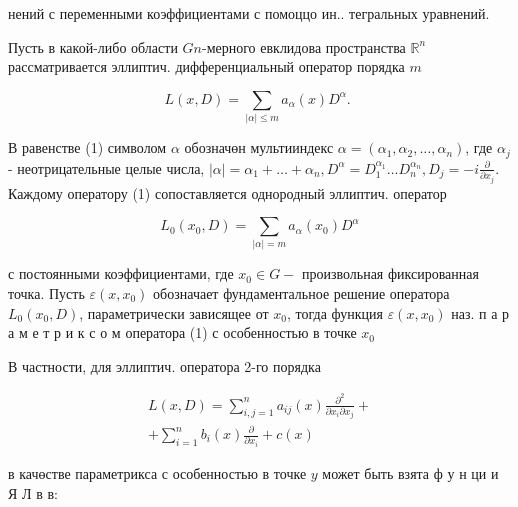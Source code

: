 \documentclass[10pt]{article}
\begin{document}
нений с переменными коэффициентами с помоццо ин.. тегральных уравнений.



Пусть в какой-либо области $G n$-мерного евклидова пространства $\mathbb{R}^{n}$ рассматривается эллиптич. дифференциальный оператор порядка $m$



\[

L(x, D)=\sum_{|\alpha| \leqslant m} a_{\alpha}(x) D^{\alpha} \text {. }

\]



В равенстве (1) символом $\alpha$ обозначөн мультииндекс $\alpha=\left(\alpha_{1}, \alpha_{2}, \ldots, \alpha_{n}\right)$, где $\alpha_{j}$ - неотрицательные целые числа, $|\alpha|=\alpha_{1}+\ldots+\alpha_{n}, D^{\alpha}=D_{1}^{\alpha_{1}} \ldots D_{n}^{\alpha_{n}}, D_{j}=-i \frac{\partial}{\partial x_{j}}$. Каждому оператору (1) сопоставляется однородный эллиптич. оператор



\[

L_{0}\left(x_{0}, D\right)=\sum_{|\alpha|=m} a_{\alpha}\left(x_{0}\right) D^{\alpha}

\]



с постоянными коэффициентами, где $x_{0} \in G-$ произвольная фиксированная точка. Пусть $\varepsilon\left(x, x_{0}\right)$ обозначает фундаментальное решение оператора $L_{0}\left(x_{0}, D\right)$, параметрически зависящее от $x_{0}$, тогда функция $\varepsilon\left(x, x_{0}\right)$ наз. п а р а м е т р и к с о м оператора (1) с особенностью в точке $x_{0}$



В частности, для эллиптич. оператора 2-го порядка



\[

\begin{gathered}

L(x, D)=\sum_{i, j=1}^{n} a_{i j}(x) \frac{\partial^{2}}{\partial x_{i} \partial x_{j}}+ \\

+\sum_{i=1}^{n} b_{i}(x) \frac{\partial}{\partial x_{i}}+c(x)

\end{gathered}

\]



в качөстве параметрикса с особенностью в точке $y$ может быть взята ф у н ци и Я Л в в:
\end{document}
